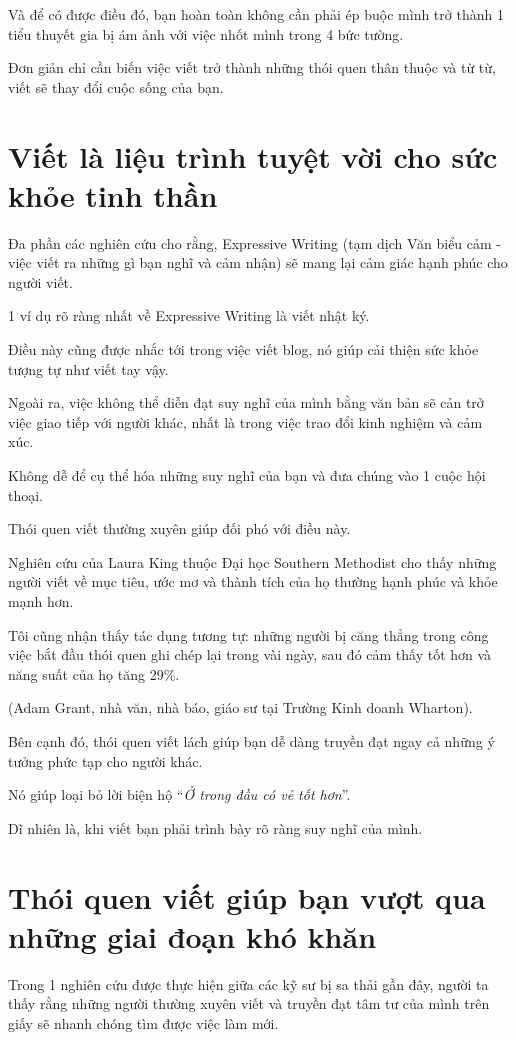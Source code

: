 \documentclass{book}
\numberwithin{equation}{section}
\begin{document}
Và để có được điều đó, bạn hoàn toàn không cần phải ép buộc mình trở thành 1 tiểu thuyết gia bị ám ảnh với việc nhốt mình trong 4 bức tường.

Đơn giản chỉ cần biến việc viết trở thành những thói quen thân thuộc và từ từ, viết sẽ thay đổi cuộc sống của bạn.

\section{Viết là liệu trình tuyệt vời cho sức khỏe tinh thần}
Đa phần các nghiên cứu cho rằng, Expressive Writing (tạm dịch Văn biểu cảm - việc viết ra những gì bạn nghĩ và cảm nhận) sẽ mang lại cảm giác hạnh phúc cho người viết.

1 ví dụ rõ ràng nhất về Expressive Writing là viết nhật ký.

Điều này cũng được nhắc tới trong việc viết blog, nó giúp cải thiện sức khỏe tượng tự như viết tay vậy.

%
Ngoài ra, việc không thể diễn đạt suy nghĩ của mình bằng văn bản sẽ cản trở việc giao tiếp với người khác, nhất là trong việc trao đổi kinh nghiệm và cảm xúc.

Không dễ để cụ thể hóa những suy nghĩ của bạn và đưa chúng vào  1 cuộc hội thoại.

Thói quen viết thường xuyên giúp đối phó với điều này.

%
Nghiên cứu của Laura King thuộc Đại học Southern Methodist cho thấy những người viết về mục tiêu, ước mơ và thành tích của họ thường hạnh phúc và khỏe mạnh hơn.

Tôi cũng nhận thấy tác dụng tương tự: những người bị căng thẳng trong công việc bắt đầu thói quen ghi chép lại trong vài ngày, sau đó cảm thấy tốt hơn và năng suất của họ tăng 29\%.

(Adam Grant, nhà văn, nhà báo, giáo sư tại Trường Kinh doanh Wharton).

%
Bên cạnh đó, thói quen viết lách giúp bạn dễ dàng truyền đạt ngay cả những ý tưởng phức tạp cho người khác.

Nó giúp loại bỏ lời biện hộ ``\textit{Ở trong đầu có vẻ tốt hơn}''.

Dĩ nhiên là, khi viết bạn phải trình bày rõ ràng suy nghĩ của mình.

\section{Thói quen viết giúp bạn vượt qua những giai đoạn khó khăn}
Trong 1 nghiên cứu được thực hiện giữa các kỹ sư bị sa thải gần đây, người ta thấy rằng những người thường xuyên viết và truyền đạt tâm tư của mình trên giấy sẽ nhanh chóng tìm được việc làm mới.
\end{document}

